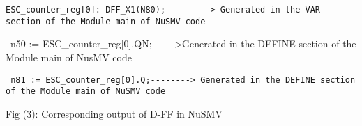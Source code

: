 \documentclass[a4paper]{article}
\begin{document}
{\centering \par}

\begin{center}
\begin{minipage}{5.96875in}
{\centering\color[rgb]{0.0,0.0,0.039215688}
\texttt{ESC\_counter\_reg[0]:
DFF\_X1(N80);-{}-{}-{}-{}-{}-{}-{}-{}-{\textgreater} Generated in the
VAR section of the Module main of NuSMV code\ }
\par}

{\ttfamily\color[rgb]{0.0,0.0,0.039215688}
\ n50 :=
ESC\_counter\_reg[0].QN;-{}-{}-{}-{}-{}-{}-{\textgreater}Generated in
the DEFINE section of the Module main of NusMV code\ }

{\color[rgb]{0.0,0.0,0.039215688}
\texttt{\ n81 :=
ESC\_counter\_reg[0].Q;-{}-{}-{}-{}-{}-{}-{}-{\textgreater} Generated
in the DEFINE section of the Module main of NuSMV code}}


\bigskip
\end{minipage}
\end{center}

\bigskip


\bigskip


\bigskip

{\centering\color[rgb]{0.0,0.0,0.039215688}
\textrm{Fig (3): Corresponding output of D-FF in NuSMV}
\par}

{\centering \par}
\end{document}
